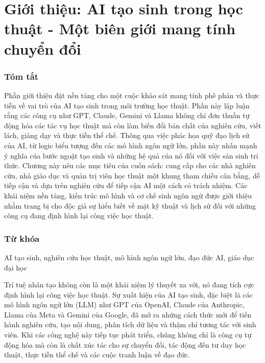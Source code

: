 \chapter*{Giới thiệu: AI tạo sinh trong học thuật - Một biên giới mang tính chuyển đổi}

\subsection{Tóm tắt}

Phần giới thiệu đặt nền tảng cho một cuộc khảo sát mang tính phê phán và thực tiễn về vai trò của AI tạo sinh trong môi trường học thuật. Phần này lập luận rằng các công cụ như GPT, Claude, Gemini và Llama không chỉ đơn thuần tự động hóa các tác vụ học thuật mà còn làm biến đổi bản chất của nghiên cứu, viết lách, giảng dạy và thực tiễn thể chế. Thông qua việc phác họa quỹ đạo lịch sử của AI, từ logic biểu tượng đến các mô hình ngôn ngữ lớn, phần này nhấn mạnh ý nghĩa của bước ngoặt tạo sinh và những hệ quả của nó đối với việc sản sinh tri thức. Chương này nêu các mục tiêu của cuốn sách: cung cấp cho các nhà nghiên cứu, nhà giáo dục và quản trị viên học thuật một khung tham chiếu cân bằng, dễ tiếp cận và dựa trên nghiên cứu để tiếp cận AI một cách có trách nhiệm. Các khái niệm nền tảng, kiến trúc mô hình và cơ chế sinh ngôn ngữ được giới thiệu nhằm trang bị cho độc giả sự hiểu biết về mặt kỹ thuật và lịch sử đối với những công cụ đang định hình lại công việc học thuật.

\subsection{Từ khóa}

AI tạo sinh, nghiên cứu học thuật, mô hình ngôn ngữ lớn, đạo đức AI, giáo dục đại học

Trí tuệ nhân tạo không còn là một khái niệm lý thuyết xa vời, nó đang tích cực định hình lại công việc học thuật. Sự xuất hiện của AI tạo sinh, đặc biệt là các mô hình ngôn ngữ lớn (LLM) như GPT của OpenAI, Claude của Anthropic, Llama của Meta và Gemini của Google, đã mở ra những cách thức mới để tiến hành nghiên cứu, tạo nội dung, phân tích dữ liệu và thậm chí tương tác với sinh viên. Khi các công nghệ này tiếp tục phát triển, chúng không chỉ là công cụ tự động hóa mà còn là chất xúc tác cho sự chuyển đổi, tác động đến tư duy học thuật, thực tiễn thể chế và các cuộc tranh luận về đạo đức.

